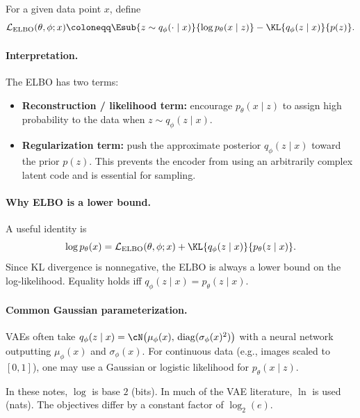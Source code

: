 \begin{definition}[ELBO]
For a given data point $x$, define
\begin{equation}
\label{eq:elbo-def}
    \mathcal{L}_{\text{ELBO}}(\theta,\phi;x)
    \coloneqq \Esub{z\sim q_\phi(\cdot\mid x)}{\log p_\theta(x\mid z)}
    - \KL{q_\phi(z\mid x)}{p(z)}.
\end{equation}
\end{definition}

\paragraph{Interpretation.}
The ELBO has two terms:
\begin{itemize}[leftmargin=2em]
    \item \textbf{Reconstruction / likelihood term:} encourage $p_\theta(x\mid z)$ to assign high probability to the data when $z\sim q_\phi(z\mid x)$.

    \item \textbf{Regularization term:} push the approximate posterior $q_\phi(z\mid x)$ toward the prior $p(z)$.
    This prevents the encoder from using an arbitrarily complex latent code and is essential for sampling.
\end{itemize}

\paragraph{Why ELBO is a lower bound.}
A useful identity is
\begin{equation}
\label{eq:elbo-gap}
    \log p_\theta(x)
    = \mathcal{L}_{\text{ELBO}}(\theta,\phi;x)
    + \KL{q_\phi(z\mid x)}{p_\theta(z\mid x)}.
\end{equation}
Since KL divergence is nonnegative, the ELBO is always a lower bound on the log-likelihood.
Equality holds iff $q_\phi(z\mid x)=p_\theta(z\mid x)$.

\paragraph{Common Gaussian parameterization.}
VAEs often take
\(
    q_\phi(z\mid x)=\cN\bigl(\mu_\phi(x),\,\mathrm{diag}(\sigma_\phi(x)^2)\bigr)
\)
with a neural network outputting $\mu_\phi(x)$ and $\sigma_\phi(x)$.
For continuous data (e.g., images scaled to $[0,1]$), one may use a Gaussian or logistic likelihood for $p_\theta(x\mid z)$.

\begin{remark}
In these notes, $\log$ is base $2$ (bits). In much of the VAE literature, $\ln$ is used (nats).
The objectives differ by a constant factor of $\log_2(e)$.
\end{remark}

